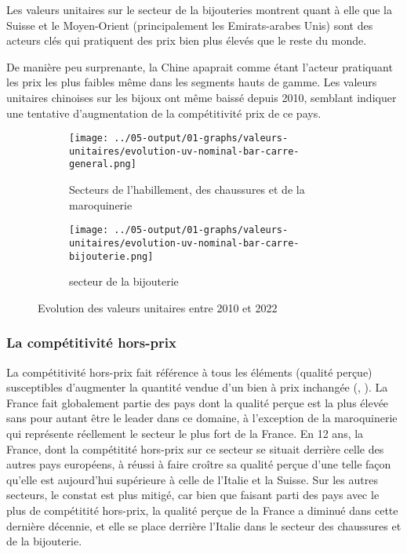 \documentclass[french,10pt,a4paper]{article}
\begin{document}
Les valeurs unitaires sur le secteur de la bijouteries montrent quant à elle que la Suisse et le Moyen-Orient (principalement les Emirats-arabes Unis) sont des acteurs clés qui pratiquent des prix bien plus élevés que le reste du monde.

De manière peu surprenante, la Chine apaprait comme étant l'acteur pratiquant les prix les plus faibles même dans les segments hauts de gamme. Les valeurs unitaires chinoises sur les bijoux ont même baissé depuis 2010, semblant indiquer une tentative d'augmentation de la compétitivité prix de ce pays. 



\begin{figure}[!h]
  \centering
  \begin{subfigure}{\textwidth}
    \centering    \texttt{[image: ../05-output/01-graphs/valeurs-unitaires/evolution-uv-nominal-bar-carre-general.png]}
    \caption{Secteurs de l'habillement, des chaussures et de la maroquinerie}
    \label{fig:evolution-uv-nominal-bar-carre-general}
  \end{subfigure}
  \vspace{0.5cm}
  \begin{subfigure}{\textwidth}
    \centering \texttt{[image: ../05-output/01-graphs/valeurs-unitaires/evolution-uv-nominal-bar-carre-bijouterie.png]}
 \caption{secteur de la bijouterie}
 \label{fig:evolution-uv-nominal-bar-carre-bijouterie.png}
  \end{subfigure}
  \caption{Evolution des valeurs unitaires entre 2010 et 2022}
  \label{fig:valeurs-unitaires}
\end{figure}


\subsubsection{La compétitivité hors-prix}
La compétitivité hors-prix fait référence à tous les éléments (qualité perçue) susceptibles d'augmenter la quantité vendue d'un bien à prix inchangée (\cite{Khandelwal2013}, \cite{Bas2015}). La France fait globalement partie des pays dont la qualité perçue est la plus élevée sans pour autant être le leader dans ce domaine, à l'exception de la maroquinerie qui représente réellement le secteur le plus fort de la France. En 12 ans, la France, dont la compétitité hors-prix sur ce secteur se situait derrière celle des autres pays européens, à réussi à faire croître sa qualité perçue d'une telle façon qu'elle est aujourd'hui supérieure à celle de l'Italie et la Suisse. Sur les autres secteurs, le constat est plus mitigé, car bien que faisant parti des pays avec le plus de compétitité hors-prix, la qualité perçue de la France a diminué dans cette dernière décennie, et elle se place derrière l'Italie dans le secteur des chaussures et de la bijouterie.
\end{document}
